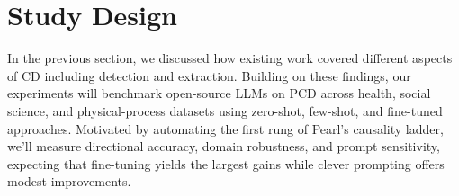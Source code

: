 \documentclass[conference]{IEEEtran}
\begin{document}


\section{Study Design}


In the previous section, we discussed how existing work covered different aspects of CD including detection and extraction. Building on these findings, our experiments will benchmark open-source LLMs on PCD across health, social science, and physical-process datasets using zero-shot, few-shot, and fine-tuned approaches. Motivated by automating the first rung of Pearl’s causality ladder, we’ll measure directional accuracy, domain robustness, and prompt sensitivity, expecting that fine-tuning yields the largest gains while clever prompting offers modest improvements. 
\end{document}
